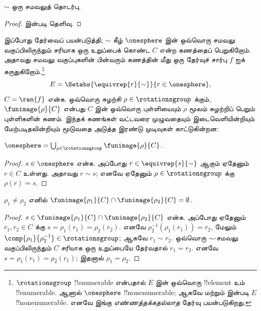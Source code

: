 \documentclass[../../../include/open-logic-section]{subfiles}
\begin{document}
\begin{lem}
$\sim$ ஒரு சமவலுத் தொடர்பு.
\end{lem}

\begin{proof}
 இன்படி தெளிவு.
\end{proof}

இப்போது தேர்வைப் பயன்படுத்தி, $\sim$ கீழ்
$\onesphere$ இன் ஒவ்வொரு சமவலு வகுப்பிலிருந்தும் சரியாக
ஒரு உறுப்பைக் கொண்ட $C$ என்ற கணத்தைப் பெறுகிறோம்.
அதாவது சமவலு வகுப்புகளின் பின்வரும் கணத்தின் மீது
ஒரு தேர்வுச் சார்பு $f$ ஐக் கருதுகிறோம்.\footnote{
$\rotationsgroup$ !!{enumerable} என்பதால் $E$ இன்
ஒவ்வொரு !!{element} உம் !!{enumerable}. ஆனால்
$\onesphere$ !!{nonenumerable}; ஆகவே
 மற்றும்
 இன்படி
$E$ !!{nonenumerable}. எனவே இங்கு \emph{எண்ணத்தக்கதல்லாத}
தேர்வு பயன்படுகிறது.}
\[
	E = \Setabs{\equivrep{r}{\sim}}{r \in \onesphere},
\]
$C = \ran{f}$ என்க. ஒவ்வொரு சுழற்சி
$\rho \in \rotationsgroup$ க்கும்,
$\funimage{\rho}{C}$ என்பது $C$ இன் ஒவ்வொரு புள்ளியையும்
$\rho$ மூலம் சுழற்றிப் பெறும் புள்ளிகளின் கணம்.
இந்தக் கணங்கள் வட்டவரை முழுவதையும் இடைவெளியின்றியும்
மேற்படிதலின்றியும் மூடுவதை அடுத்த இரண்டு முடிவுகள்
காட்டுகின்றன:

\begin{lem}
$\onesphere = \bigcup_{\rho \in \rotationsgroup} \funimage{\rho}{C}$.
\end{lem}

\begin{proof}
$s \in \onesphere$ என்க. அப்போது
$r \in \equivrep{s}{\sim}$ ஆகும் ஏதேனும் $r \in C$
உள்ளது. அதாவது $r \sim s$; எனவே ஏதேனும்
$\rho \in \rotationsgroup$ க்கு $\rho(r) = s$.
\end{proof}

\begin{lem}
$\rho_1 \neq \rho_2$ எனில்
$\funimage{\rho_1}{C} \cap \funimage{\rho_2}{C} = \emptyset$.
\end{lem}

\begin{proof}
$s \in \funimage{\rho_{1}}{C} \cap \funimage{\rho_{2}}{C}$
என்க. அப்போது ஏதேனும் $r_{1}, r_{2} \in C$ க்கு
$s = \rho_{1}(r_{1}) = \rho_{2}(r_{2})$.
எனவே $\rho^{-1}_2(\rho_1(r_1)) = r_2$, மேலும்
$\comp{\rho_1}{\rho^{-1}_2} \in \rotationsgroup$;
ஆகவே $r_{1} \sim r_{2}$. ஒவ்வொரு $\sim$-சமவலு
வகுப்பிலிருந்தும் $C$ சரியாக ஒரு உறுப்பையே தேர்வதால்
$r_1 = r_2$. எனவே $s = \rho_1(r_1) = \rho_2(r_1)$;
இதனால் $\rho_1 = \rho_2$.
\end{proof}
\end{document}

